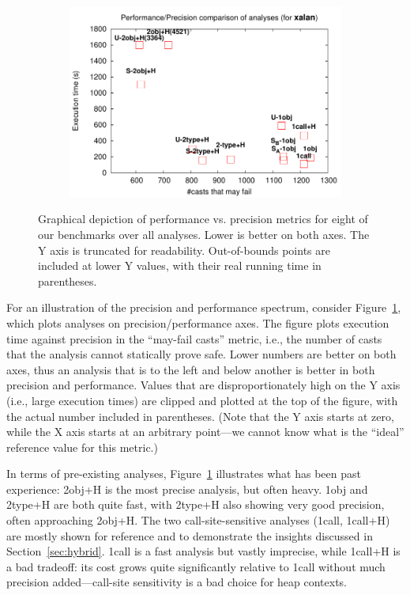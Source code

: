 \begin{figure}[tbp]
\begin{center}
\begin{subfigure}[b]{0.45\textwidth}
\includegraphics[width=\textwidth]{assets/hybrid/xalan.pdf}
\end{subfigure}
\caption{Graphical depiction of performance vs. precision metrics for
eight of our benchmarks over all analyses. Lower is better on both axes.
The Y axis is truncated for readability. Out-of-bounds points are included
at lower Y values, with their real running time in parentheses.
}
\label{fig:precision}
\end{center}
\end{figure}

For an illustration of the precision and performance spectrum,
consider Figure~\ref{fig:precision}, which plots analyses on
precision/performance axes. The figure plots execution time against
precision in the ``may-fail casts'' metric, i.e., the number of casts
that the analysis cannot statically prove safe.  Lower numbers are
better on both axes, thus an analysis that is to the left and below
another is better in both precision and performance.  Values that are
disproportionately high on the Y axis (i.e., large execution times)
are clipped and plotted at the top of the figure, with the actual
number included in parentheses. (Note that the Y axis starts at zero,
while the X axis starts at an arbitrary point---we cannot know what is
the ``ideal'' reference value for this metric.)

In terms of pre-existing analyses, Figure~\ref{fig:precision}
illustrates what has been past experience: 2obj+H is the most precise
analysis, but often heavy. 1obj and 2type+H are both quite fast, with
2type+H also showing very good precision, often approaching
2obj+H. The two call-site-sensitive analyses (1call, 1call+H) are
mostly shown for reference and to demonstrate the insights discussed
in Section~\ref{sec:hybrid}. 1call is a fast analysis but vastly
imprecise, while 1call+H is a bad tradeoff: its cost grows quite
significantly relative to 1call without much precision
added---call-site sensitivity is a bad choice for heap contexts.


